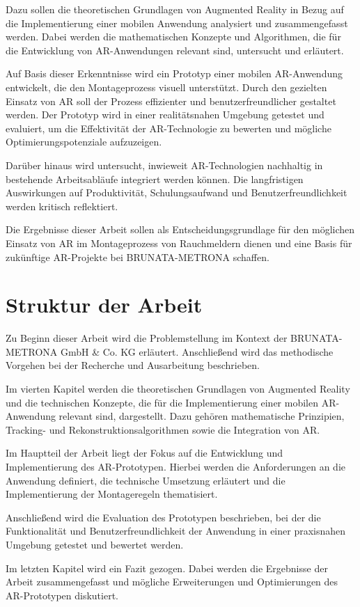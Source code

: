 Dazu sollen die theoretischen Grundlagen von Augmented Reality in Bezug auf die Implementierung einer mobilen Anwendung analysiert und zusammengefasst werden. Dabei werden die mathematischen Konzepte und Algorithmen, die für die Entwicklung von AR-Anwendungen relevant sind, untersucht und erläutert.

Auf Basis dieser Erkenntnisse wird ein Prototyp einer mobilen AR-Anwendung entwickelt, die den Montageprozess visuell unterstützt. Durch den gezielten Einsatz von AR soll der Prozess effizienter und benutzerfreundlicher gestaltet werden. Der Prototyp wird in einer realitätsnahen Umgebung getestet und evaluiert, um die Effektivität der AR-Technologie zu bewerten und mögliche Optimierungspotenziale aufzuzeigen.

Darüber hinaus wird untersucht, inwieweit AR-Technologien nachhaltig in bestehende Arbeitsabläufe integriert werden können. Die langfristigen Auswirkungen auf Produktivität, Schulungsaufwand und Benutzerfreundlichkeit werden kritisch reflektiert.

Die Ergebnisse dieser Arbeit sollen als Entscheidungsgrundlage für den möglichen Einsatz von AR im Montageprozess von Rauchmeldern dienen und eine Basis für zukünftige AR-Projekte bei BRUNATA-METRONA schaffen.

\section{Struktur der Arbeit}

Zu Beginn dieser Arbeit wird die Problemstellung im Kontext der BRUNATA-METRONA GmbH \& Co. KG erläutert. Anschließend wird das methodische Vorgehen bei der Recherche und Ausarbeitung beschrieben. 

Im vierten Kapitel werden die theoretischen Grundlagen von Augmented Reality und die technischen Konzepte, die für die Implementierung einer mobilen AR-Anwendung relevant sind, dargestellt. Dazu gehören mathematische Prinzipien, Tracking- und Rekonstruktionsalgorithmen sowie die Integration von AR.

Im Hauptteil der Arbeit liegt der Fokus auf die Entwicklung und Implementierung des AR-Prototypen. Hierbei werden die Anforderungen an die Anwendung definiert, die technische Umsetzung erläutert und die Implementierung der Montageregeln thematisiert. 

Anschließend wird die Evaluation des Prototypen beschrieben, bei der die Funktionalität und Benutzerfreundlichkeit der Anwendung in einer praxisnahen Umgebung getestet und bewertet werden.

Im letzten Kapitel wird ein Fazit gezogen. Dabei werden die Ergebnisse der Arbeit zusammengefasst und mögliche Erweiterungen und Optimierungen des AR-Prototypen diskutiert.

